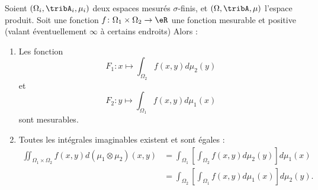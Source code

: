 \begin{theorem}\label{ThoWTMSthY}
    Soient \( (\Omega_i,\tribA_i,\mu_i)\) deux espaces mesurés \( \sigma\)-finis, et \( (\Omega,\tribA,\mu)\) l'espace produit. Soit une fonction \( f\colon \Omega_1\times \Omega_2\to \eR\) une fonction mesurable et positive (valant éventuellement \( \infty\) à certains endroits)
    Alors :
    \begin{enumerate}
        \item
            Les fonction
            \begin{equation}
                F_1\colon x\mapsto \int_{\Omega_2}f(x,y)d\mu_2(y)
            \end{equation}
            et
            \begin{equation}
                F_2\colon y\mapsto \int_{\Omega_1}f(x,y)d\mu_1(x)
            \end{equation}
            sont mesurables.
        \item
            Toutes les intégrales imaginables existent et sont égales :
            \begin{subequations}    \label{EqJRVtOGx}
                \begin{align}
                    \iint_{\Omega_1\times \Omega_2}f(x,y)d(\mu_1\otimes \mu_2)(x,y)&=\int_{\Omega_1}\left[ \int_{\Omega_2}f(x,y)d\mu_2(y) \right]d\mu_1(x)\\
                &=\int_{\Omega_2}\left[ \int_{\Omega_1}f(x,y)d\mu_1(x) \right]d\mu_2(y).
                \end{align}
            \end{subequations}
    \end{enumerate}
\end{theorem}


